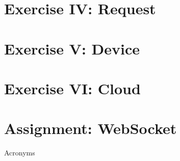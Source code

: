 \documentclass[aspectratio=169]{beamer}
\begin{document}
\section{Exercise IV:  Request}


\section{Exercise V:  Device}


\section{Exercise VI:  Cloud}


\section{Assignment: WebSocket}


\appendix

\begin{frame}[allowframebreaks]{Acronyms}
    \printglossary[type=\acronymtype, nonumberlist]
\end{frame}

%     
\end{document}
